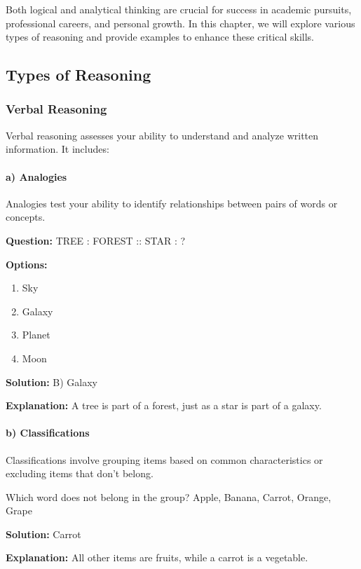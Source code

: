 Both logical and analytical thinking are crucial for success in academic
pursuits, professional careers, and personal growth. In this chapter, we
will explore various types of reasoning and provide examples to enhance
these critical skills.

\subsection{Types of Reasoning}

\subsubsection{Verbal Reasoning}

Verbal reasoning assesses your ability to understand and analyze written
information. It includes:

\paragraph{a) Analogies}

Analogies test your ability to identify relationships between pairs of
words or concepts.

\begin{example}
\textbf{Question:} TREE : FOREST :: STAR : ?

\textbf{Options:}
\begin{enumerate}
    \item Sky
    \item Galaxy
    \item Planet
    \item Moon
\end{enumerate}

\textbf{Solution:} B) Galaxy

\textbf{Explanation:} A tree is part of a forest, just as a star is part of a galaxy.
\end{example}

\paragraph{b) Classifications}

Classifications involve grouping items based on common characteristics
or excluding items that don't belong.

\begin{example}
Which word does not belong in the group?
Apple, Banana, Carrot, Orange, Grape

\textbf{Solution:} Carrot

\textbf{Explanation:} All other items are fruits, while a carrot is a vegetable.
\end{example}

